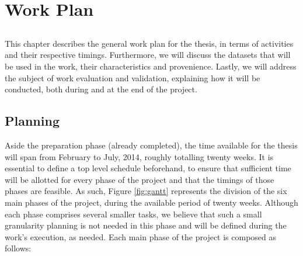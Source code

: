 \chapter{Work Plan} \label{chap:workplan}

\section*{}

This chapter describes the general work plan for the thesis, in terms of
activities and their respective timings. Furthermore, we will discuss the
datasets that will be used in the work, their characteristics and provenience.
Lastly, we will address the subject of work evaluation and validation,
explaining how it will be conducted, both during and at the end of the project.

\section{Planning}\label{sec:planning}

Aside the preparation phase (already completed), the time available for the
thesis will span from February to July, 2014, roughly totalling twenty weeks. It
is essential to define a top level schedule beforehand, to ensure that
sufficient time will be allotted for every phase of the project and that the
timings of those phases are feasible. As such, Figure \ref{fig:gantt} represents
the division of the six main phases of the project, during the available period
of twenty weeks. Although each phase comprises several smaller tasks, we believe
that such a small granularity planning is not needed in this phase and will be
defined during the work's execution, as needed. Each main phase of the project
is composed as follows:

